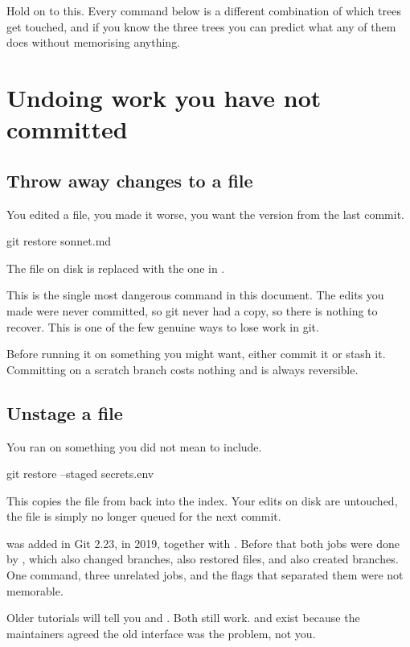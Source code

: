 \documentclass[11pt]{article}
\begin{document}
Hold on to this. Every command below is a different combination of which trees get
touched, and if you know the three trees you can predict what any of them does
without memorising anything.

\section{Undoing work you have not committed}

\subsection{Throw away changes to a file}

You edited a file, you made it worse, you want the version from the last commit.

\begin{shell}
git restore sonnet.md
\end{shell}

The file on disk is replaced with the one in .

\begin{trap}
This is the single most dangerous command in this document. The edits you made
were never committed, so git never had a copy, so there is nothing to recover.
This is one of the few genuine ways to lose work in git.

Before running it on something you might want, either commit it or stash it.
Committing on a scratch branch costs nothing and is always reversible.
\end{trap}

\subsection{Unstage a file}

You ran  on something you did not mean to include.

\begin{shell}
git restore --staged secrets.env
\end{shell}

This copies the file from  back into the index. Your edits on disk are
untouched, the file is simply no longer queued for the next commit.

\begin{why}
 was added in Git 2.23, in 2019, together with .
Before that both jobs were done by , which also changed branches,
also restored files, and also created branches. One command, three unrelated jobs,
and the flags that separated them were not memorable.

Older tutorials will tell you  and .
Both still work.  and  exist because the maintainers agreed
the old interface was the problem, not you.
\end{why}
\end{document}
